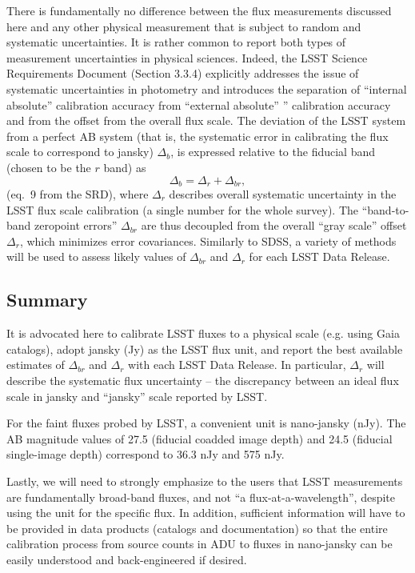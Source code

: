 \documentclass[DM,lsstdraft,toc,usenatbib]{lsstdoc}
\begin{document}
There is fundamentally no difference between the flux measurements discussed
here and any other physical measurement that is subject to random and systematic
uncertainties. It is rather common to report both types of measurement uncertainties
in physical sciences. Indeed, the LSST  Science Requirements Document (Section 3.3.4)
explicitly addresses the issue of systematic uncertainties in photometry and
introduces the separation of ``internal absolute'' calibration accuracy 
from ``external absolute'' ” calibration accuracy and from the offset from the
overall flux scale. The deviation of the LSST system from a perfect AB system
(that is, the systematic error in calibrating the flux scale to correspond to jansky)  
$\Delta_b$, is expressed relative to the fiducial band (chosen to be the $r$ band)
as \begin{equation}
             \Delta_b = \Delta_r + \Delta_{br}, 
\end{equation}
(eq.~9 from the SRD), where $\Delta_r$ describes overall systematic uncertainty 
in the LSST flux scale calibration (a single number for the whole survey). The 
``band-to-band zeropoint errors'' $\Delta_{br}$ are thus decoupled from the overall 
``gray scale'' offset $\Delta_{r}$, which minimizes error covariances. Similarly to SDSS, 
a variety of methods will be used to assess likely values of $\Delta_{br}$ and 
$\Delta_r$ for each LSST Data Release. 


\subsection{Summary} 

It is advocated here to calibrate LSST fluxes to a physical scale (e.g. using
Gaia catalogs), adopt jansky (Jy) as the LSST flux unit, and report the best available
estimates of $\Delta_{br}$ and $\Delta_r$ with each LSST Data Release. In particular, 
$\Delta_r$ will describe the systematic flux uncertainty --  the discrepancy between an 
ideal flux scale in jansky and ``jansky'' scale reported by LSST. 

For the faint fluxes probed by LSST, a convenient unit is nano-jansky (nJy). 
The AB magnitude values of 27.5 (fiducial coadded image depth)  and 24.5 (fiducial 
single-image depth) correspond to 36.3 nJy and 575 nJy. 

Lastly, we will need to strongly emphasize to the users that LSST measurements are 
fundamentally broad-band fluxes, and not ``a flux-at-a-wavelength'', despite using the 
unit for the specific flux. In addition, sufficient information will have to be provided 
in data products (catalogs and documentation) so that the entire calibration process from 
source counts in ADU to fluxes in nano-jansky can be easily understood and back-engineered
if desired. 
\end{document}
